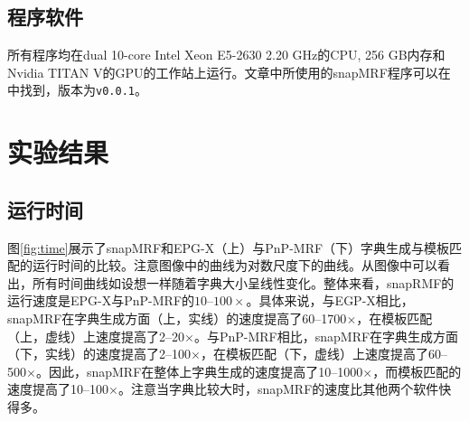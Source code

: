 \subsection{程序软件}
所有程序均在dual 10-core Intel Xeon E5-2630 2.20 GHz的CPU, 256 GB内存和Nvidia TITAN V的GPU的工作站上运行。文章中所使用的snapMRF程序可以在\cite{snapMRF}中找到，版本为\texttt{v0.0.1}。

\section{实验结果}
\subsection{运行时间}
图\ref{fig:time}展示了snapMRF和EPG-X（上）与PnP-MRF（下）字典生成与模板匹配的运行时间的比较。注意图像中的曲线为对数尺度下的曲线。从图像中可以看出，所有时间曲线如设想一样随着字典大小呈线性变化。整体来看，snapRMF的运行速度是EPG-X与PnP-MRF的$10$--$100 \times$。具体来说，与EGP-X相比，snapMRF在字典生成方面（上，实线）的速度提高了60--1700$\times$，在模板匹配（上，虚线）上速度提高了2--20$\times$。与PnP-MRF相比，snapMRF在字典生成方面（下，实线）的速度提高了2--100$\times$，在模板匹配（下，虚线）上速度提高了60--500$\times$。因此，snapMRF在整体上字典生成的速度提高了10--1000$\times$，而模板匹配的速度提高了10--100$\times$。注意当字典比较大时，snapMRF的速度比其他两个软件快得多。


